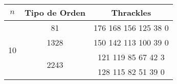 \begin{tabular}[t]{|c|c|c|}
  \end{tabular}
  \begin{tabular}[p]{|c|c|c|}
    \hline
    $n$                 &Tipo de Orden        & Thrackles         \\ \hline\hline
    \multirow{4}{*}{10} & 81                  & 176 168 156 125 38 0 \\ \cline{2-3}
                        & 1328                &150 142 113 100 39 0 \\ \cline{2-3}
                        & \multirow{2}{*}{2243}& 121 119 85 67 42 3 \\ \cline{3-3}
                        &                     & 128 115 82 51 39 0 \\ \hline
  \end{tabular}
